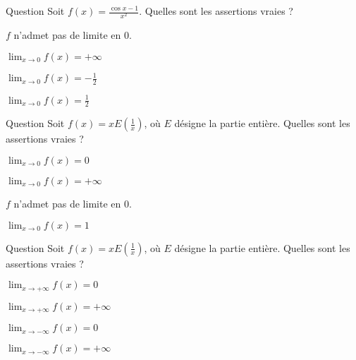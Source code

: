 \begin{multi}[multiple,feedback=
{On a : \(\cos x = \cos^2 (\frac{x}{2}) -  \sin^2 (\frac{x}{2})\) et \(1= \cos^2 (\frac{x}{2}) + \sin^2 (\frac{x}{2})\), donc \(\cos x - 1 = -2 \sin ^2 (\frac{x}{2})\). D'autre part, \(\lim_{x\to 0}\frac{\sin x}{x} = 1\). On déduit que   \(\lim_{x\to 0} f(x) = \lim_{x\to 0} -\frac{1}{2}  \big(\frac{\sin (\frac{x}{2})}{\frac{x}{2}}\big)^2 = -\frac{1}{2}\).
}]{Question}
Soit \(f(x)= \frac{\cos x-1}{x^2}\). Quelles sont les assertions vraies ?

    \item \(f\) n'admet pas de limite en \(0\).
    \item \(\lim_{x\to 0} f(x)=+\infty\)
    \item* \(\lim_{x\to 0} f(x)=-\frac{1}{2}\)
    \item \(\lim_{x\to 0} f(x)=\frac{1}{2}\)
\end{multi}


\begin{multi}[multiple,feedback=
{Pour tout \(x\in \Rr\), on a : \(x-1<E(x)\le x\). Donc \(1-x < f(x) \le 1\), pour \(x>0\) et  
\(1 \le f(x) < 1-x\), pour \(x<0\). On déduit que \(\lim_{x\to 0} f(x) =1\). 
}]{Question}
Soit \(f(x)= xE(\frac{1}{x})\), où \(E\) désigne la partie entière. Quelles sont les assertions vraies ?

    \item \(\lim_{x\to 0} f(x)=0\)
    \item \(\lim_{x\to 0} f(x)=+\infty\)
    \item \(f\) n'admet pas de limite en \(0\).
    \item* \(\lim_{x\to 0} f(x)=1\)
\end{multi}


\begin{multi}[multiple,feedback=
{Pour \(x>1\),  \(E(\frac{1}{x})=0\), donc \(f(x)=0\) et donc  \(\lim_{x\to +\infty} f(x)=0\). 
Pour \(x<-1\),  \(E(\frac{1}{x})=-1\), donc \(f(x)=-x\) et donc  \(\lim_{x\to -\infty} f(x)=+\infty\). 
}]{Question}
Soit \(f(x)= xE(\frac{1}{x})\), où \(E\) désigne la partie entière. Quelles sont les assertions vraies ?

    \item* \(\lim_{x\to +\infty} f(x)=0\)
    \item \(\lim_{x\to +\infty} f(x)=+\infty\)
    \item \(\lim_{x\to -\infty} f(x)=0\)
    \item* \(\lim_{x\to -\infty} f(x)=+\infty\)
\end{multi}


